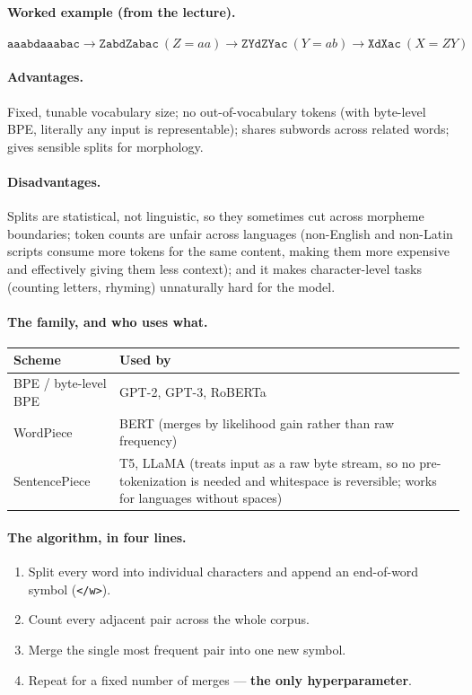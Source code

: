 \documentclass[11pt,a4paper]{article}
\begin{document}
\paragraph{Worked example (from the lecture).}
\[
\texttt{aaabdaaabac} \rightarrow \texttt{ZabdZabac}\ (Z{=}aa) \rightarrow
\texttt{ZYdZYac}\ (Y{=}ab) \rightarrow \texttt{XdXac}\ (X{=}ZY)
\]

\paragraph{Advantages.} Fixed, tunable vocabulary size; no out-of-vocabulary tokens (with
byte-level BPE, literally any input is representable); shares subwords across related words;
gives sensible splits for morphology.

\paragraph{Disadvantages.} Splits are statistical, not linguistic, so they sometimes cut
across morpheme boundaries; token counts are unfair across languages (non-English and
non-Latin scripts consume more tokens for the same content, making them more expensive and
effectively giving them less context); and it makes character-level tasks (counting letters,
rhyming) unnaturally hard for the model.

\paragraph{The family, and who uses what.}
\begin{center}
\begin{tabularx}{\textwidth}{lY}
\textbf{Scheme} & \textbf{Used by} \\
\hline
BPE / byte-level BPE & GPT-2, GPT-3, RoBERTa \\
WordPiece & BERT (merges by likelihood gain rather than raw frequency) \\
SentencePiece & T5, LLaMA (treats input as a raw byte stream, so no pre-tokenization is
needed and whitespace is reversible; works for languages without spaces) \\
\end{tabularx}
\end{center}

\paragraph{The algorithm, in four lines.}
\begin{enumerate}
\item Split every word into individual characters and append an end-of-word symbol
  (\texttt{</w>}).
\item Count every adjacent pair across the whole corpus.
\item Merge the single most frequent pair into one new symbol.
\item Repeat for a fixed number of merges --- \textbf{the only hyperparameter}.
\end{enumerate}
\end{document}
